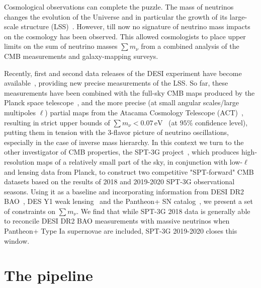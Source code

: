 \documentclass[12pt,a4paper]{article}
\newcommand{\eV}{\,\text{eV}}
\newcommand\?{/\hspace{0pt}}
\def\Mnu{\sum m_\nu}
\begin{document}
Cosmological observations can complete the puzzle. The mass of neutrinos changes the evolution of the Universe and in particular the growth of its large-scale structure (LSS)~\cite{Racco:2024lbu}. However, till now no signature of neutrino mass impacts on the cosmology has been observed. This allowed cosmologists to place upper limits on the sum of neutrino masses $\sum m_\nu$ from a combined analysis of the CMB measurements and galaxy-mapping surveys. 

Recently, first and second data releases of the DESI experiment have become available~\cite{DESI:2024lzq,DESI:2024uvr,DESI:2025zpo}, providing new precise measurements of the LSS. So far, these measurements have been combined with the full-sky CMB maps produced by the Planck space telescope~\cite{Planck:2018vyg,Tristram:2023haj}, and the more precise (at small angular scales/large multipoles $\ell$) partial maps from the Atacama Cosmology Telescope (ACT)~\cite{ACT:2023dou}, resulting in strict upper bounds of $\sum m_\nu <0.07 \eV$~\cite{DESI:2024hhd,DESI:2024mwx,DESI:2025zgx} (at $95\%$ confidence level), putting them in tension with the 3-flavor picture of neutrino oscillations, especially in the case of inverse mass hierarchy. In this context we turn to the other investigator of CMB properties, the SPT-3G project~\cite{SPT-3G:2014dbx}, which produces high-resolution maps of a relatively small part of the sky, in conjunction with low-$\ell$ and lensing data from Planck, to construct two competitive "SPT-forward" CMB datasets based on the results of 2018 and 2019-2020 SPT-3G observational seasons. Using it as a baseline and incorporating information from DESI DR2 BAO~\cite{DESI:2025zgx}, DES Y1 weak lensing~\cite{DES:2017myr} and the Pantheon+ SN catalog~\cite{Scolnic:2021amr}, we present a set of constraints on $\Mnu$. We find that while SPT-3G 2018 data is generally able to reconcile DESI DR2 BAO measurements with massive neutrinos when Pantheon+ Type Ia supernovae are included, SPT-3G 2019-2020 closes this window.


 



\section{The pipeline}
\label{sec:param}
\end{document}
